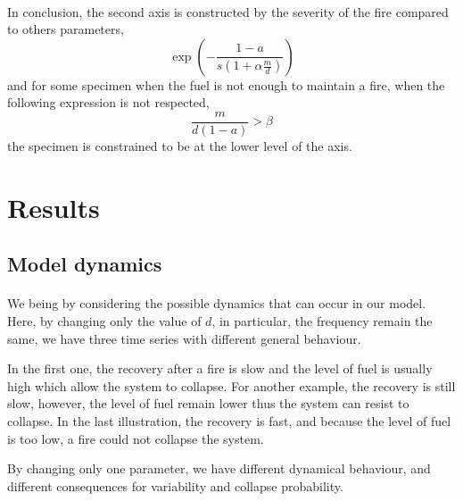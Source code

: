 \documentclass{article}
\begin{document}
\paragraph{}
In conclusion, the second axis is constructed by the severity of the fire compared to others parameters, 
\[
\exp(-\frac{1-a}{s(1+\alpha\frac{m}{d})})
\]
and for some specimen when the fuel is not enough to maintain a fire, when the following expression is not respected,
\[
\frac{m}{d( 1-a)} > \beta
\]
the specimen is constrained to be at the lower level of the axis.



\newpage

\section{Results}

\subsection{Model dynamics}




\paragraph{}
We being by considering the possible dynamics that can occur in our model. Here, by changing only the value of $d$, in particular, the frequency remain the same, we have three time series with different general behaviour.

In the first one, the recovery after a fire is slow and the level of fuel is usually high which allow the system to collapse. For another example, the recovery is still slow, however, the level of fuel remain lower thus the system can resist to collapse. In the last illustration, the recovery is fast, and because the level of fuel is too low, a fire could not collapse the system.

By changing only one parameter, we have different dynamical behaviour, and different consequences for variability and collapse probability.
\end{document}
